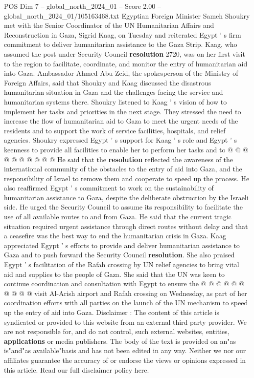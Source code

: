 \begin{textsample}{POS Dim 7 – global\_north\_2024\_01 – Score 2.00 – global\_north\_2024\_01/105163468.txt}  \label{ex:f7_pos_248}
Egyptian Foreign Minister Sameh Shoukry met with the Senior Coordinator of the UN Humanitarian Affairs and Reconstruction in Gaza, Sigrid Kaag, on Tuesday and reiterated Egypt ' s firm commitment to deliver humanitarian assistance to the Gaza Strip.
Kaag, who assumed the post under Security Council \textbf{resolution} 2720, was on her first visit to the region to facilitate, coordinate, and monitor the entry of humanitarian aid into Gaza.
Ambassador Ahmed Abu Zeid, the spokesperson of the Ministry of Foreign Affairs, said that Shoukry and Kaag discussed the disastrous humanitarian situation in Gaza and the challenges facing the service and humanitarian systems there.
Shoukry listened to Kaag ' s vision of how to implement her tasks and priorities in the next stage.
They stressed the need to increase the flow of humanitarian aid to Gaza to meet the urgent needs of the residents and to support the work of service facilities, hospitals, and relief agencies.
Shoukry expressed Egypt ' s support for Kaag ' s role and Egypt ' s keenness to provide all facilities to enable her to perform her tasks and to @ @ @ @ @ @ @ @ @ @ He said that the \textbf{resolution} reflected the awareness of the international community of the obstacles to the entry of aid into Gaza, and the responsibility of Israel to remove them and cooperate to speed up the process.
He also reaffirmed Egypt ' s commitment to work on the sustainability of humanitarian assistance to Gaza, despite the deliberate obstruction by the Israeli side.
He urged the Security Council to assume its responsibility to facilitate the use of all available routes to and from Gaza.
He said that the current tragic situation required urgent assistance through direct routes without delay and that a ceasefire was the best way to end the humanitarian crisis in Gaza.
Kaag appreciated Egypt ' s efforts to provide and deliver humanitarian assistance to Gaza and to push forward the Security Council \textbf{resolution}.
She also praised Egypt ' s facilitation of the Rafah crossing by UN relief agencies to bring vital aid and supplies to the people of Gaza.
She said that the UN was keen to continue coordination and consultation with Egypt to ensure the @ @ @ @ @ @ @ @ @ @ visit Al-Arish airport and Rafah crossing on Wednesday, as part of her coordination efforts with all parties on the launch of the UN mechanism to speed up the entry of aid into Gaza.
Disclaimer : The content of this article is syndicated or provided to this website from an external third party provider.
We are not responsible for, and do not control, such external websites, entities, \textbf{applications} or media publishers.
The body of the text is provided on an"as is"and"as available"basis and has not been edited in any way.
Neither we nor our affiliates guarantee the accuracy of or endorse the views or opinions expressed in this article.
Read our full disclaimer policy here.

\end{textsample}
